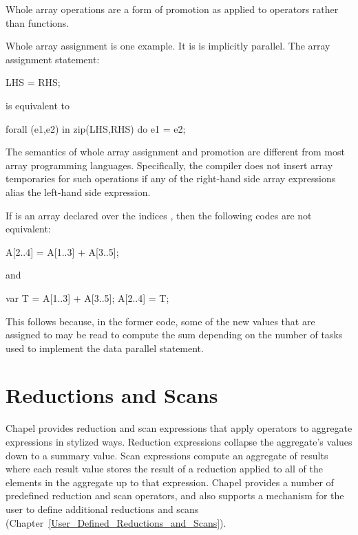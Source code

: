 Whole array operations are a form of promotion as applied to operators
rather than functions.

Whole array assignment is one example. It is is implicitly parallel.
The array assignment statement:
\begin{chapel}
LHS = RHS;
\end{chapel}
is equivalent to
\begin{chapel}
forall (e1,e2) in zip(LHS,RHS) do
  e1 = e2;
\end{chapel}

The semantics of whole array assignment and promotion are different
from most array programming languages.  Specifically, the compiler
does not insert array temporaries for such operations if any of the
right-hand side array expressions alias the left-hand side expression.

%
%
\begin{example}
If  is an array declared over the indices , then
the following codes are not equivalent:
\begin{chapel}
A[2..4] = A[1..3] + A[3..5];
\end{chapel}
and
\begin{chapel}
var T = A[1..3] + A[3..5];
A[2..4] = T;
\end{chapel}
This follows because, in the former code, some of the new values that
are assigned to  may be read to compute the sum depending on
the number of tasks used to implement the data parallel statement.
\end{example}



\section{Reductions and Scans}
\label{Reductions_and_Scans}

Chapel provides reduction and scan expressions that apply operators to
aggregate expressions in stylized ways.  Reduction expressions
collapse the aggregate's values down to a summary value.  Scan
expressions compute an aggregate of results where each result value
stores the result of a reduction applied to all of the elements in the
aggregate up to that expression.  Chapel provides a number of predefined
reduction and scan operators, and also supports a mechanism for the
user to define additional reductions and
scans (Chapter~\ref{User_Defined_Reductions_and_Scans}).

